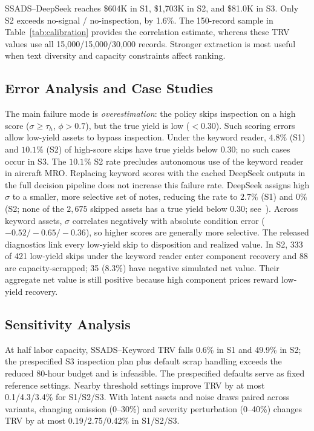 \documentclass[a4paper,conference]{IEEEtran}
\begin{document}
SSADS--DeepSeek reaches \$604K in S1, \$1,703K in S2, and \$81.0K in S3.
Only S2 exceeds no-signal / no-inspection, by 1.6\%. The 150-record sample in
Table~\ref{tab:calibration} provides the correlation estimate, whereas these TRV
values use all 15{,}000/15{,}000/30{,}000 records. Stronger
extraction is most useful when text diversity and capacity constraints affect
ranking.

\subsection{Error Analysis and Case Studies}\label{sec:error}
The main failure mode is \emph{overestimation}: the policy skips
inspection on a high score ($\sigma{\geq}\tau_h$, $\phi{>}0.7$), but the true
yield is low ($<0.30$). Such scoring errors allow low-yield assets to bypass
inspection. Under the keyword reader, $4.8\%$ (S1) and $10.1\%$ (S2) of
high-score skips have true yields below $0.30$; no such cases occur in S3. The
$10.1\%$ S2 rate precludes autonomous use of the keyword reader in aircraft MRO.
Replacing keyword scores with the cached DeepSeek outputs in the full decision
pipeline does not increase this failure rate. DeepSeek assigns high $\sigma$ to a
smaller, more selective set of notes, reducing the rate to $2.7\%$ (S1) and
$0\%$ (S2; none of the $2{,}675$ skipped assets has a true yield below $0.30$;
see~\cite{RLDBRepo}).
Across keyword assets, $\sigma$ correlates negatively with absolute condition error
($-0.52/-0.65/-0.36$), so higher scores are generally more selective. The released
diagnostics link every low-yield skip to disposition and realized value. In S2, 333 of
421 low-yield skips under the keyword reader enter component recovery and 88 are
capacity-scrapped; 35
(8.3\%) have negative simulated net value. Their aggregate net value is still
positive because high component prices reward low-yield recovery.

\subsection{Sensitivity Analysis}\label{sec:sensitivity}
At half labor capacity, SSADS--Keyword TRV falls 0.6\% in S1 and 49.9\% in S2;
the prespecified S3 inspection plan plus default scrap handling exceeds the
reduced 80-hour budget and is infeasible. The prespecified defaults serve as fixed
reference settings. Nearby threshold settings improve TRV
by at most 0.1/4.3/3.4\%
for S1/S2/S3.
With latent assets and noise draws paired across variants, changing omission
(0--30\%) and severity perturbation (0--40\%) changes TRV by at most
0.19/2.75/0.42\% in S1/S2/S3.
\end{document}

